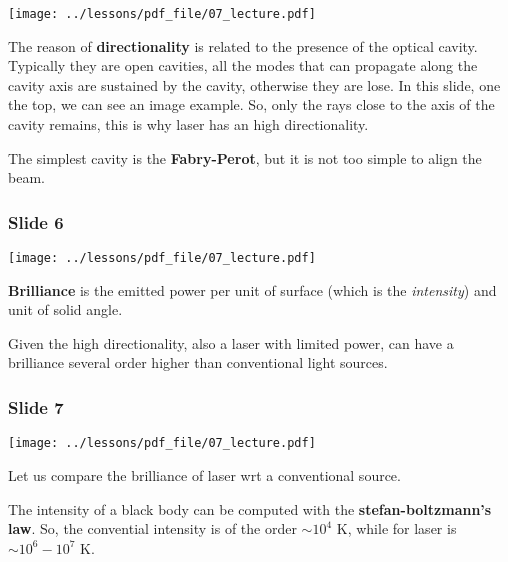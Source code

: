 \documentclass[../main/main.tex]{subfiles}
\begin{document}
\begin{minipage}[]{0.5\linewidth}
\centering
\texttt{[image: ../lessons/pdf\_file/07\_lecture.pdf]}
\end{minipage}
\hspace{0.3cm}\vspace{0.3cm}
\begin{minipage}[c]{0.47\linewidth}

The reason of \textbf{directionality} is related to the presence of the optical cavity. Typically they are open cavities, all the modes that can propagate along the cavity axis are sustained by the cavity, otherwise they are lose.
In this slide, one the top, we can see an image example.
So, only the rays close to the axis of the cavity remains, this is why laser has an high directionality.

The simplest cavity is the \textbf{Fabry-Perot}, but it is not too simple to align the beam.

\end{minipage}

\subsubsection*{Slide 6}

\begin{minipage}[]{0.5\linewidth}
\centering
\texttt{[image: ../lessons/pdf\_file/07\_lecture.pdf]}
\end{minipage}
\hspace{0.3cm}\vspace{0.3cm}
\begin{minipage}[c]{0.47\linewidth}

\textbf{Brilliance} is the emitted power per unit of surface (which is the \emph{intensity}) and unit of solid angle.

Given the high directionality, also a laser with limited power, can have a brilliance several order higher than conventional light sources.

\end{minipage}

\newpage

\subsubsection*{Slide 7}

\begin{minipage}[]{0.5\linewidth}
\centering
\texttt{[image: ../lessons/pdf\_file/07\_lecture.pdf]}
\end{minipage}
\hspace{0.3cm}\vspace{0.3cm}
\begin{minipage}[c]{0.47\linewidth}

Let us compare the brilliance of laser wrt a conventional source.

The intensity of a black body can be computed with the \textbf{stefan-boltzmann's law}. So, the convential intensity is of the order \( \sim 10^4 \) K, while for laser is \( \sim 10^6-10^7 \) K.

\end{minipage}
\end{document}
